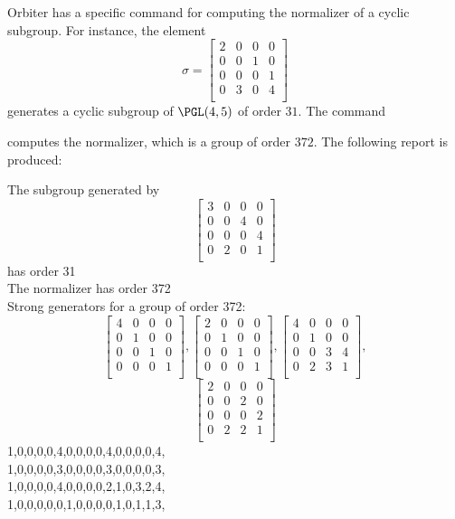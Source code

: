 Orbiter has a specific command for computing the normalizer of a cyclic subgroup. For instance, the 
element 
$$
\sigma=
\left[
\begin{array}{*{4}{r}}
2 & 0 & 0 & 0\\
0 & 0 & 1 & 0\\
0 & 0 & 0 & 1\\
0 & 3 & 0 & 4\\
\end{array}
\right]
$$
generates a cyclic subgroup of $\PGL(4,5)$ of order $31$.
The command
{\tt

}
computes the normalizer, which is a group of order $372$. The following report is produced:
\begin{mdframed}[style=MyFrame]
The subgroup generated by 
$$
\left[
\begin{array}{*{4}{r}}
3 & 0 & 0 & 0\\
0 & 0 & 4 & 0\\
0 & 0 & 0 & 4\\
0 & 2 & 0 & 1\\
\end{array}
\right]
$$
has order 31\\
The normalizer has order 372\\
Strong generators for a group of order 372:
$$
\left[
\begin{array}{*{4}{r}}
4 & 0 & 0 & 0\\
0 & 1 & 0 & 0\\
0 & 0 & 1 & 0\\
0 & 0 & 0 & 1\\
\end{array}
\right]
, 
\left[
\begin{array}{*{4}{r}}
2 & 0 & 0 & 0\\
0 & 1 & 0 & 0\\
0 & 0 & 1 & 0\\
0 & 0 & 0 & 1\\
\end{array}
\right]
, 
\left[
\begin{array}{*{4}{r}}
4 & 0 & 0 & 0\\
0 & 1 & 0 & 0\\
0 & 0 & 3 & 4\\
0 & 2 & 3 & 1\\
\end{array}
\right]
, 
$$
$$
\left[
\begin{array}{*{4}{r}}
2 & 0 & 0 & 0\\
0 & 0 & 2 & 0\\
0 & 0 & 0 & 2\\
0 & 2 & 2 & 1\\
\end{array}
\right]
$$
1,0,0,0,0,4,0,0,0,0,4,0,0,0,0,4,\\
1,0,0,0,0,3,0,0,0,0,3,0,0,0,0,3,\\
1,0,0,0,0,4,0,0,0,0,2,1,0,3,2,4,\\
1,0,0,0,0,0,1,0,0,0,0,1,0,1,1,3,\\
\end{mdframed}
